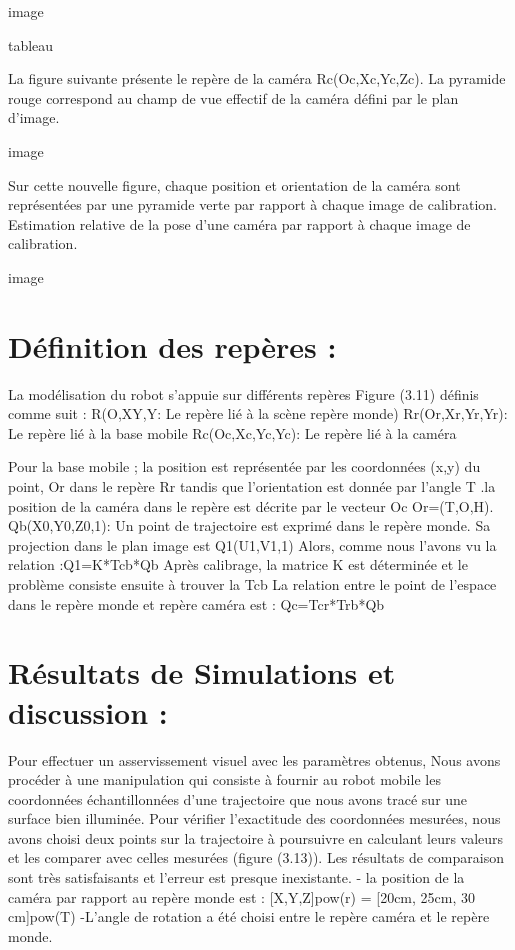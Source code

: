 image

tableau

La figure suivante présente le repère de la caméra Rc(Oc,Xc,Yc,Zc). La pyramide 
rouge correspond au champ de vue effectif de la caméra défini par le plan d'image.

image

Sur cette nouvelle figure, chaque position et orientation de la caméra sont représentées
par une pyramide verte par rapport à chaque image de calibration.
Estimation relative de la pose d'une caméra par rapport à chaque image de 
calibration.

image 

\section{ Définition des repères : }
La modélisation du robot s'appuie sur différents repères Figure (3.11) définis comme suit :
R(O,XY,Y: Le repère lié à la scène repère monde)
Rr(Or,Xr,Yr,Yr): Le repère lié à la base mobile
Rc(Oc,Xc,Yc,Yc): Le repère lié à la caméra

Pour la base mobile ; la position est représentée par les coordonnées (x,y) du point, Or dans le repère Rr tandis que l'orientation est donnée par l'angle T .la position de la caméra dans le repère est décrite par le vecteur Oc Or=(T,O,H).
Qb(X0,Y0,Z0,1): Un point de trajectoire est exprimé dans le repère monde. Sa projection 
dans le plan image est Q1(U1,V1,1) Alors, comme nous l'avons vu la relation :Q1=K*Tcb*Qb
Après calibrage, la matrice K est déterminée et le problème consiste ensuite à trouver la 
Tcb
La relation entre le point de l'espace dans le repère monde et repère caméra est :
Qc=Tcr*Trb*Qb
\section{Résultats de Simulations et discussion :}
Pour effectuer un asservissement visuel avec les paramètres obtenus, Nous avons 
procéder à une manipulation qui consiste à fournir au robot mobile les coordonnées 
échantillonnées d'une trajectoire que nous avons tracé sur une surface bien illuminée. Pour 
vérifier l'exactitude des coordonnées mesurées, nous avons choisi deux points sur la 
trajectoire à poursuivre en calculant leurs valeurs et les comparer avec celles mesurées (figure 
(3.13)). Les résultats de comparaison sont très satisfaisants et l'erreur est presque inexistante. 
 - la position de la caméra par rapport au repère monde est : 
[X,Y,Z]pow(r) = [20cm, 25cm, 30 cm]pow(T)
 -L'angle de rotation a été choisi entre le repère caméra et le repère monde.

